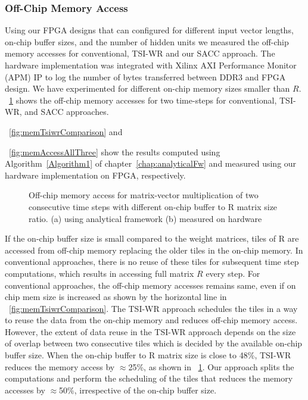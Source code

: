 \subsubsection{Off-Chip Memory Access}
Using our FPGA designs that can configured for different input vector lengths, on-chip buffer sizes, and the number of hidden units we measured the off-chip memory accesses for conventional, TSI-WR and our SACC approach. The hardware implementation was integrated with Xilinx AXI Performance Monitor (APM) IP to log the number of bytes transferred between DDR3 and FPGA design.
We have experimented for different on-chip memory sizes smaller than $R$. \figurename{~\ref{fig:memAccessImprovement}} shows the off-chip memory accesses for two time-steps for conventional, TSI-WR, and SACC approaches.  \figurename{~\ref{fig:memTsiwrComparison} and \figurename{~\ref{fig:memAccessAllThree} show the results computed using Algorithm~\ref{Algorithm1} of chapter~\ref{chap:analyticalFw} and measured using our hardware implementation on FPGA, respectively. 

\begin{figure}[htb!]
	\centering
	\hspace{2.0em}
	\caption{Off-chip memory access for matrix-vector multiplication of two consecutive time steps with different on-chip buffer to R matrix size ratio.  (a)  using analytical framework (b) measured on hardware}	
	\label{fig:memAccessImprovement}
	\vspace{-1.0em}	
\end{figure}
If the on-chip buffer size is small compared to the weight matrices, tiles of R are accessed from off-chip memory replacing the older tiles in the on-chip memory. In conventional approaches, there is no reuse of these tiles for subsequent time step computations, which results in accessing full matrix $R$ every step. For conventional approaches, the off-chip memory accesses remains same, even if on chip mem size is increased as shown by the horizontal line in \figurename{~\ref{fig:memTsiwrComparison}.
The TSI-WR approach schedules the tiles in a way to reuse the data from the on-chip memory and reduces off-chip memory access. However, the extent of data reuse in the TSI-WR approach depends on the size of overlap between two consecutive tiles which is decided by the available on-chip buffer size. When the on-chip buffer to R matrix size is close to 48\%, TSI-WR reduces the memory access by $\approx$25\%, as shown in \figurename{~\ref{fig:memAccessImprovement}}. Our approach splits the computations and perform the scheduling of the tiles that reduces the memory accesses by $\approx$50\%, irrespective of the on-chip buffer size.
}}}
